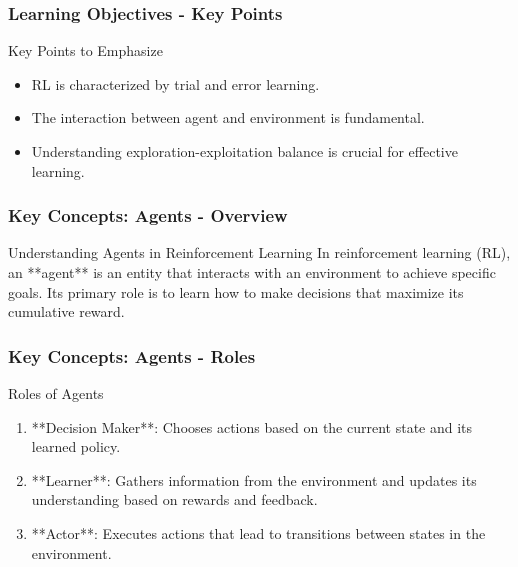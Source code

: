 \documentclass{beamer}
\begin{document}
\begin{frame}[fragile]
    \frametitle{Learning Objectives - Key Points}
    \begin{block}{Key Points to Emphasize}
        \begin{itemize}
            \item RL is characterized by trial and error learning.
            \item The interaction between agent and environment is fundamental.
            \item Understanding exploration-exploitation balance is crucial for effective learning.
        \end{itemize}
    \end{block}
\end{frame}

\begin{frame}[fragile]
    \frametitle{Key Concepts: Agents - Overview}
    \begin{block}{Understanding Agents in Reinforcement Learning}
        In reinforcement learning (RL), an **agent** is an entity that interacts with an environment to achieve specific goals. Its primary role is to learn how to make decisions that maximize its cumulative reward.
    \end{block}
\end{frame}

\begin{frame}[fragile]
    \frametitle{Key Concepts: Agents - Roles}
    \begin{block}{Roles of Agents}
        \begin{enumerate}
            \item **Decision Maker**: Chooses actions based on the current state and its learned policy.
            \item **Learner**: Gathers information from the environment and updates its understanding based on rewards and feedback.
            \item **Actor**: Executes actions that lead to transitions between states in the environment.
        \end{enumerate}
    \end{block}
\end{frame}
\end{document}
